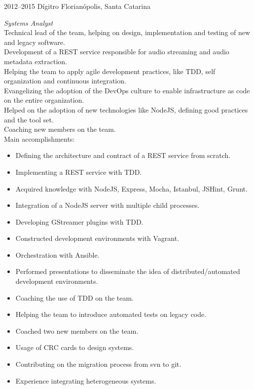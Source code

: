 \documentclass[]{friggeri-cv} %
\begin{document}
\begin{entrylist}
\entry
{2012--2015}
{Dígitro}
{Florianópolis, Santa Catarina}
{\emph{Systems Analyst} \\

Technical lead of the team, helping on design, implementation and testing of new and legacy software.\\

Development of a REST service responsible for audio streaming and audio metadata extraction.\\

Helping the team to apply agile development practices, like TDD, self organization and continuous integration.\\

Evangelizing the adoption of the DevOps culture to enable infrastructure as code on the entire organization.\\

Helped on the adoption of new technologies like NodeJS, defining good practices and the tool set.\\

Coaching new members on the team.\\

Main accomplishments:\\

\begin{itemize}
\item Defining the architecture and contract of a REST service from scratch.
\item Implementing a REST service with TDD.
\item Acquired knowledge with NodeJS, Express, Mocha, Istanbul, JSHint, Grunt.
\item Integration of a NodeJS server with multiple child processes.
\item Developing GStreamer plugins with TDD.
\item Constructed development environments with Vagrant.
\item Orchestration with Ansible.
\item Performed presentations to disseminate the idea of distributed/automated development environments.
\item Coaching the use of TDD on the team.
\item Helping the team to introduce automated tests on legacy code.
\item Coached two new members on the team.
\item Usage of CRC cards to design systems.
\item Contributing on the migration process from svn to git.
\item Experience integrating heterogeneous systems.
\end{itemize}
}
\end{entrylist}
\end{document}

